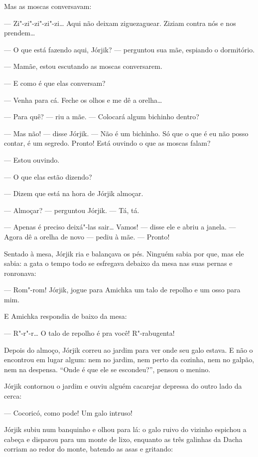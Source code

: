Mas as moscas conversavam:

--- Zi"-zi"-zi"-zi"-zi\ldots{} Aqui não deixam ziguezaguear. Ziziam contra nós e
nos prendem\ldots{}

--- O que está fazendo aqui, Jórjik? --- perguntou sua mãe, espiando o
dormitório.

--- Mamãe, estou escutando as moscas conversarem.

--- E como é que elas conversam?

--- Venha para cá. Feche os olhos e me dê a orelha\ldots{}

--- Para quê? --- riu a mãe. --- Colocará algum bichinho dentro?

--- Mas não! --- disse Jórjik. --- Não é um bichinho. Só que o que é eu
não posso contar, é um segredo. Pronto! Está ouvindo o que as moscas
falam?

--- Estou ouvindo.

--- O que elas estão dizendo?

--- Dizem que está na hora de Jórjik almoçar.

--- Almoçar? --- perguntou Jórjik. --- Tá, tá.

--- Apenas é preciso deixá"-las sair\ldots{} Vamos! --- disse ele e abriu a
janela. --- Agora dê a orelha de novo --- pediu à mãe. --- Pronto!

Sentado à mesa, Jórjik ria e balançava os pés. Ninguém sabia por que,
mas ele sabia: a gata o tempo todo se esfregava debaixo da mesa nas suas
pernas e ronronava:

--- Rom"-rom! Jórjik, jogue para Amichka um talo de repolho e um osso
para mim.

E Amichka respondia de baixo da mesa:

--- R"-r"-r\ldots{} O talo de repolho é pra você! R"-rabugenta!

Depois do almoço, Jórjik correu ao jardim para ver onde seu galo estava.
E não o encontrou em lugar algum: nem no jardim, nem perto da cozinha,
nem no galpão, nem na despensa. ``Onde é que ele se escondeu?'', pensou
o menino.

Jórjik contornou o jardim e ouviu alguém cacarejar depressa do outro
lado da cerca:

--- Cocoricó, como pode! Um galo intruso!

Jórjik subiu num banquinho e olhou para lá: o galo ruivo do vizinho
espichou a cabeça e disparou para um monte de lixo, enquanto as três
galinhas da Dacha corriam ao redor do monte, batendo as asas e gritando:

